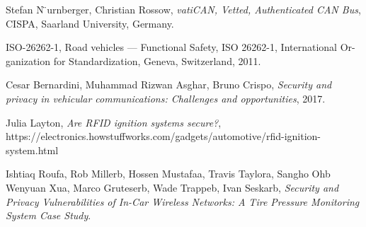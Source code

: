 \documentclass[11pt]{article}
\begin{document}
\begin{thebibliography}{10}
    Stefan N ̈urnberger, Christian Rossow,
    \textit{vatiCAN, Vetted, Authenticated CAN Bus},
	CISPA, Saarland University, Germany.
	
	ISO-26262-1, Road vehicles — Functional Safety, ISO 26262-1, International Or- ganization for Standardization, Geneva, Switzerland, 2011.
	
	Cesar Bernardini, Muhammad Rizwan Asghar, Bruno Crispo,
	\textit{Security and privacy in vehicular communications: Challenges and opportunities}, 2017.
	
	Julia Layton, \textit{Are RFID ignition systems secure?}, https://electronics.howstuffworks.com/gadgets/automotive/rfid-ignition-system.html
	
	Ishtiaq Roufa, Rob Millerb, Hossen Mustafaa, Travis Taylora, Sangho Ohb
	Wenyuan Xua, Marco Gruteserb, Wade Trappeb, Ivan Seskarb, \textit{Security and Privacy Vulnerabilities of In-Car Wireless Networks: A Tire Pressure Monitoring System Case Study}.

	
\end{thebibliography}
\end{document}
